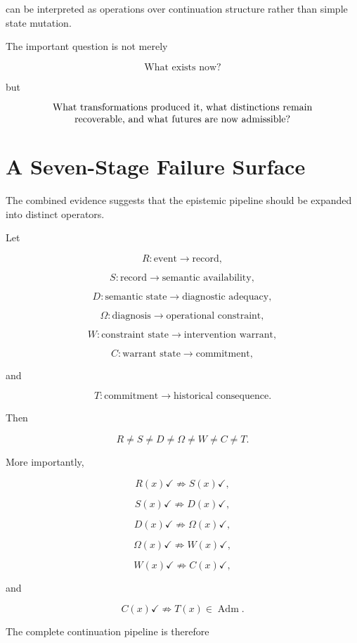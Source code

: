 \documentclass[11pt]{article}
\newcommand{\Adm}{\operatorname{Adm}}
\begin{document}
can be interpreted as operations over continuation structure rather than simple state mutation.

The important question is not merely

\[ \text{What exists now?}\]

but

\[ \parbox{0.85\textwidth}{\centering What transformations produced it, what distinctions remain recoverable, and what futures are now admissible?} \]

\section{A Seven-Stage Failure Surface}

The combined evidence suggests that the epistemic pipeline should be expanded into distinct operators.

Let

\[ R:\text{event}\rightarrow\text{record},\]

\[ S:\text{record}\rightarrow\text{semantic availability},\]

\[ D:\text{semantic state}\rightarrow\text{diagnostic adequacy},\]

\[ \Omega:\text{diagnosis}\rightarrow\text{operational constraint},\]

\[ W:\text{constraint state}\rightarrow\text{intervention warrant},\]

\[ C:\text{warrant state}\rightarrow\text{commitment},\]

and

\[ T:\text{commitment}\rightarrow\text{historical consequence}.\]

Then

\[ \boxed{ R\neq S\neq D\neq\Omega\neq W\neq C\neq T. }\]

More importantly,

\[ R(x)\checkmark \not\Rightarrow S(x)\checkmark,\]

\[ S(x)\checkmark \not\Rightarrow D(x)\checkmark,\]

\[ D(x)\checkmark \not\Rightarrow \Omega(x)\checkmark,\]

\[ \Omega(x)\checkmark \not\Rightarrow W(x)\checkmark,\]

\[ W(x)\checkmark \not\Rightarrow C(x)\checkmark,\]

and

\[ C(x)\checkmark \not\Rightarrow T(x)\in\Adm.\]

The complete continuation pipeline is therefore
\end{document}
